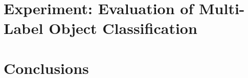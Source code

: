 \documentclass[11pt,a4paper]{article}
\begin{document}
	
	\section{Experiment: Evaluation of Multi-Label Object Classification}
	\label{sec:modeling}
	
	
	\section{Conclusions}
	\label{sec:conc}
	
	
	
	
	
\end{document}
